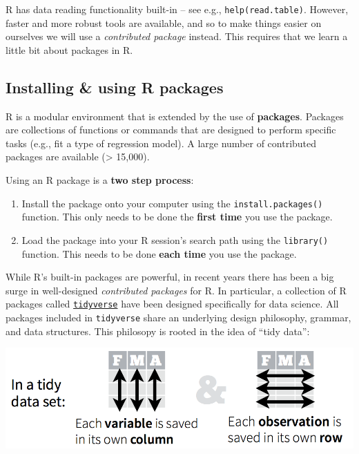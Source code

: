 \documentclass[]{book}
\begin{document}
R has data reading functionality built-in -- see e.g.,
\texttt{help(read.table)}. However, faster and more robust tools are
available, and so to make things easier on ourselves we will use a
\emph{contributed package} instead. This requires that we
learn a little bit about packages in R.

\hypertarget{installing-using-r-packages}{%
\subsection{Installing \& using R packages}\label{installing-using-r-packages}}

R is a modular environment that is extended by the use of \textbf{packages}.
Packages are collections of functions or commands that are designed to
perform specific tasks (e.g., fit a type of regression model). A large
number of contributed packages are available (\textgreater{} 15,000).

Using an R package is a \textbf{two step process}:

\begin{enumerate}
\def\labelenumi{\arabic{enumi}.}
\item
  Install the package onto your computer using the
  \texttt{install.packages()} function. This only needs to
  be done the \textbf{first time} you use the package.
\item
  Load the package into your R session's search path
  using the \texttt{library()} function. This needs to be done
  \textbf{each time} you use the package.
\end{enumerate}

While R's built-in packages are powerful, in recent years there has
been a big surge in well-designed \emph{contributed packages} for R. In
particular, a collection of R packages called
\href{https://www.tidyverse.org/}{\texttt{tidyverse}} have been
designed specifically for data science. All packages included in
\texttt{tidyverse} share an underlying design philosophy, grammar, and
data structures. This philosopy is rooted in the idea of ``tidy data'':

\includegraphics{R/Rintro/images/tidy_data.png}
\end{document}
